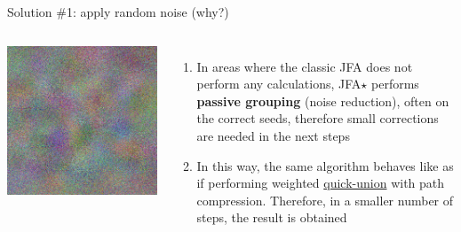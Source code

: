 \documentclass[aspectratio=169, 22pt]{beamer}
\begin{document}
\begin{frame}{Solution \#1: apply random noise (why?)}
\begin{columns}
	\includegraphics[width=1\linewidth]{./lazy_clouds.png}%

\begin{enumerate}
\item In areas where the classic JFA does not perform any calculations,
	JFA$\star$ performs \textbf{passive grouping} (noise reduction), often on the
	correct seeds, therefore small corrections are needed in the next steps
\item In this way, the same algorithm behaves like as if performing
	weighted \underline{quick-union} with path compression. Therefore, in a smaller number of steps, the result is obtained
\end{enumerate}

\end{columns}
\end{frame}

\end{document}
